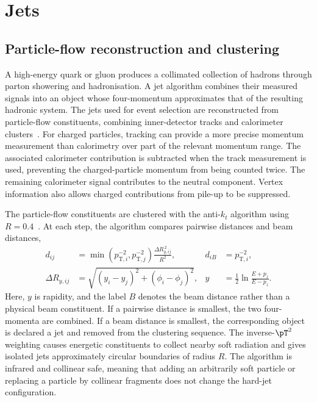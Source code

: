 \section{Jets}
\label{sec:ch6_jets}

\subsection{Particle-flow reconstruction and clustering}

A high-energy quark or gluon produces a collimated collection of hadrons through parton showering and hadronisation.
A jet algorithm combines their measured signals into an object whose four-momentum approximates that of the resulting hadronic system.
The jets used for event selection are reconstructed from particle-flow constituents, combining inner-detector tracks and calorimeter clusters~\cite{ATLAS2017ParticleFlow}.
For charged particles, tracking can provide a more precise momentum measurement than calorimetry over part of the relevant momentum range.
The associated calorimeter contribution is subtracted when the track measurement is used, preventing the charged-particle momentum from being counted twice.
The remaining calorimeter signal contributes to the neutral component.
Vertex information also allows charged contributions from pile-up to be suppressed.

The particle-flow constituents are clustered with the anti-$k_t$ algorithm using $R=0.4$~\cite{Cacciari2008AntiKt}.
At each step, the algorithm compares pairwise distances and beam distances,
\begin{align}
    d_{ij}
    &= \min\!\left(p_{\mathrm{T},i}^{-2},p_{\mathrm{T},j}^{-2}\right)
       \frac{\Delta R_{y,ij}^{\,2}}{R^2},
    &
    d_{iB} &= p_{\mathrm{T},i}^{-2},
    \label{eq:ch6_antikt}\\
    \Delta R_{y,ij}
    &= \sqrt{(y_i-y_j)^2+(\phi_i-\phi_j)^2},
    &
    y &= \frac{1}{2}\ln\frac{E+p_z}{E-p_z}.
    \label{eq:ch6_rapidity}
\end{align}
Here, $y$ is rapidity, and the label $B$ denotes the beam distance rather than a physical beam constituent.
If a pairwise distance is smallest, the two four-momenta are combined.
If a beam distance is smallest, the corresponding object is declared a jet and removed from the clustering sequence.
The inverse-$\pT^2$ weighting causes energetic constituents to collect nearby soft radiation and gives isolated jets approximately circular boundaries of radius $R$.
The algorithm is infrared and collinear safe, meaning that adding an arbitrarily soft particle or replacing a particle by collinear fragments does not change the hard-jet configuration.

